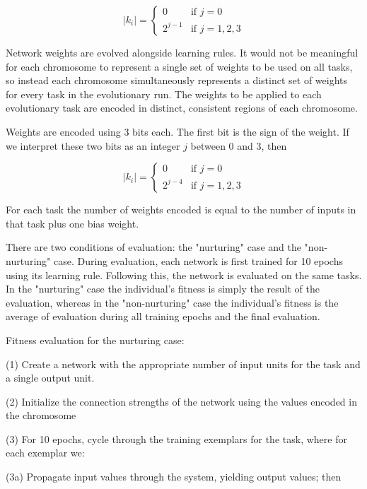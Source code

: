 \documentclass[master]{outhesis}
\begin{document}
\[
	|k_i|=
	\begin{cases}
		0 & \text{if $j = 0$}\\
		2^{j-1} & \text{if $j = 1, 2, 3$}
	\end{cases}
\]


Network weights are evolved alongside learning rules. It would not be meaningful for each chromosome to represent a single set of weights to be used on all tasks, so instead each chromosome simultaneously represents a distinct set of weights for every task in the evolutionary run. The weights to be applied to each evolutionary task are encoded in distinct, consistent regions of each chromosome. 

\newcommand{\bitsperweight}{3}
\newcommand{\jlen}{2}
\newcommand{\jmin}{0}
\newcommand{\jmax}{3}
\newcommand{\exponentshift}{4}

Weights are encoded using 3 bits each. The first bit is the sign of the weight. If we interpret these two bits as an integer $j$ between 0 and 3, then

\[
	|k_i|=
	\begin{cases}
		0 & \text{if $j = 0$}\\
		2^{j-4} & \text{if $j = 1, 2, 3$}
	\end{cases}
\]

For each task the number of weights encoded is equal to the number of inputs in that task plus one bias weight.

There are two conditions of evaluation: the "nurturing" case and the "non-nurturing" case. During evaluation, each network is first trained for 10 epochs using its learning rule. Following this, the network is evaluated on the same tasks. In the "nurturing" case the individual's fitness is simply the result of the evaluation, whereas in the "non-nurturing" case the individual's fitness is the average of evaluation during all training epochs and the final evaluation.

Fitness evaluation for the nurturing case:

(1) Create a network with the appropriate number of input units for the task and a single output unit.

(2) Initialize the connection strengths of the network using the values encoded in the chromosome

(3) For 10 epochs, cycle through the training exemplars for the task, where for each exemplar we:

(3a) Propagate input values through the system, yielding output values; then
\end{document}
